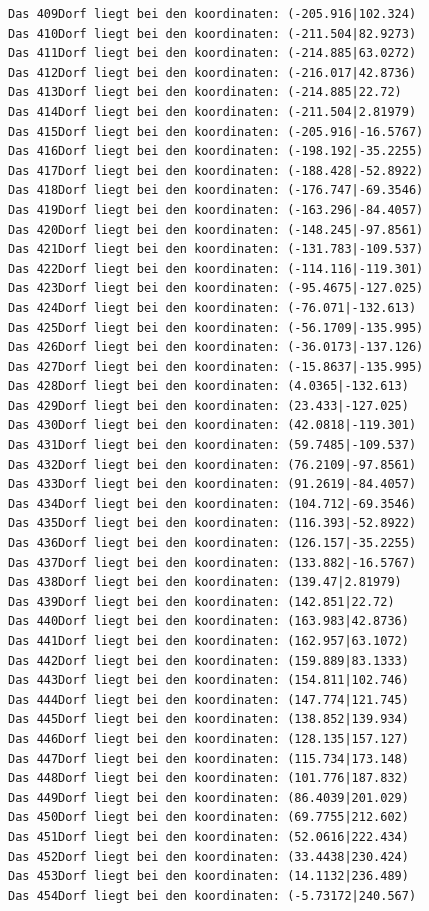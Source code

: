 \documentclass{article}
\begin{document}
\begin{verbatim}
Das 409Dorf liegt bei den koordinaten: (-205.916|102.324)
Das 410Dorf liegt bei den koordinaten: (-211.504|82.9273)
Das 411Dorf liegt bei den koordinaten: (-214.885|63.0272)
Das 412Dorf liegt bei den koordinaten: (-216.017|42.8736)
Das 413Dorf liegt bei den koordinaten: (-214.885|22.72)
Das 414Dorf liegt bei den koordinaten: (-211.504|2.81979)
Das 415Dorf liegt bei den koordinaten: (-205.916|-16.5767)
Das 416Dorf liegt bei den koordinaten: (-198.192|-35.2255)
Das 417Dorf liegt bei den koordinaten: (-188.428|-52.8922)
Das 418Dorf liegt bei den koordinaten: (-176.747|-69.3546)
Das 419Dorf liegt bei den koordinaten: (-163.296|-84.4057)
Das 420Dorf liegt bei den koordinaten: (-148.245|-97.8561)
Das 421Dorf liegt bei den koordinaten: (-131.783|-109.537)
Das 422Dorf liegt bei den koordinaten: (-114.116|-119.301)
Das 423Dorf liegt bei den koordinaten: (-95.4675|-127.025)
Das 424Dorf liegt bei den koordinaten: (-76.071|-132.613)
Das 425Dorf liegt bei den koordinaten: (-56.1709|-135.995)
Das 426Dorf liegt bei den koordinaten: (-36.0173|-137.126)
Das 427Dorf liegt bei den koordinaten: (-15.8637|-135.995)
Das 428Dorf liegt bei den koordinaten: (4.0365|-132.613)
Das 429Dorf liegt bei den koordinaten: (23.433|-127.025)
Das 430Dorf liegt bei den koordinaten: (42.0818|-119.301)
Das 431Dorf liegt bei den koordinaten: (59.7485|-109.537)
Das 432Dorf liegt bei den koordinaten: (76.2109|-97.8561)
Das 433Dorf liegt bei den koordinaten: (91.2619|-84.4057)
Das 434Dorf liegt bei den koordinaten: (104.712|-69.3546)
Das 435Dorf liegt bei den koordinaten: (116.393|-52.8922)
Das 436Dorf liegt bei den koordinaten: (126.157|-35.2255)
Das 437Dorf liegt bei den koordinaten: (133.882|-16.5767)
Das 438Dorf liegt bei den koordinaten: (139.47|2.81979)
Das 439Dorf liegt bei den koordinaten: (142.851|22.72)
Das 440Dorf liegt bei den koordinaten: (163.983|42.8736)
Das 441Dorf liegt bei den koordinaten: (162.957|63.1072)
Das 442Dorf liegt bei den koordinaten: (159.889|83.1333)
Das 443Dorf liegt bei den koordinaten: (154.811|102.746)
Das 444Dorf liegt bei den koordinaten: (147.774|121.745)
Das 445Dorf liegt bei den koordinaten: (138.852|139.934)
Das 446Dorf liegt bei den koordinaten: (128.135|157.127)
Das 447Dorf liegt bei den koordinaten: (115.734|173.148)
Das 448Dorf liegt bei den koordinaten: (101.776|187.832)
Das 449Dorf liegt bei den koordinaten: (86.4039|201.029)
Das 450Dorf liegt bei den koordinaten: (69.7755|212.602)
Das 451Dorf liegt bei den koordinaten: (52.0616|222.434)
Das 452Dorf liegt bei den koordinaten: (33.4438|230.424)
Das 453Dorf liegt bei den koordinaten: (14.1132|236.489)
Das 454Dorf liegt bei den koordinaten: (-5.73172|240.567)

\end{verbatim}
\end{document}
